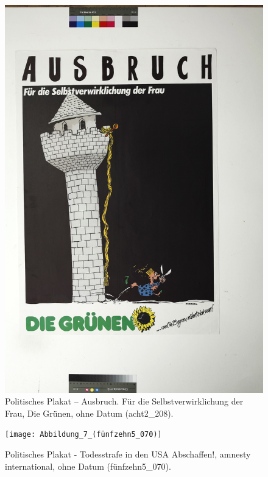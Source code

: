 \documentclass[a4paper,12pt,ngerman]{article}
\begin{document}
\newpage
\begin{figure}[ht]
\includegraphics[width=\linewidth]{Abbildung_6_(acht2_208)}
\centering
\caption{Politisches Plakat – Ausbruch. Für die Selbstverwirklichung der Frau, Die Grünen, ohne Datum (acht2\_208).}
\end{figure}

\newpage
\begin{figure}[ht]
\texttt{[image: Abbildung\_7\_(fünfzehn5\_070)]}
\centering
\caption{Politisches Plakat - Todesstrafe in den USA Abschaffen!, amnesty international, ohne Datum (fünfzehn5\_070).}
\end{figure}
\end{document}
